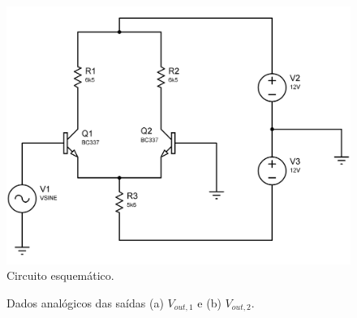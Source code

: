 \documentclass[a4paper,12pt,oneside,openany,table,xcdraw]{article}
\begin{document}
\vspace{0.5cm}
\begin{figure}[H]
\centering
\includegraphics[width=13cm]{sim-circuito}
\caption{Circuito esquemático.}
\label{sim:circuito}
\end{figure}

\begin{figure}[H]
\center
{}\hfill
{} 
\caption{Dados analógicos das saídas (a) $V_{out,1}$ e (b) $V_{out,2}$.}
\label{sim:out}
\end{figure}
\vspace{0.5cm}
\end{document}
